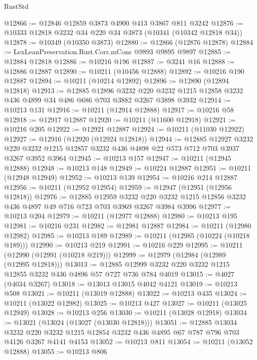 \begin{lexlean}{RustStd}
\begin{coremodule}
@12866 := @12846 @12859 @3873 @4900 @413 @3867 @811 @3242
@12876 := @10333 @12818 @3232 @34 @220 @34 @3873 (@10341 (@10342 @12818 @34))
@12878 := @10349 (@10350 @3873)
@12880 := @12866 (@12876 @12878)
@12884 := LexLeanPreservation.Rust.Corr.mCons @9893 @9895 @9897
@12885 := @12884 @12818
@12886 := @10216 @196
@12887 := @3241 @16
@12888 := @12886 @12887
@12890 := @10211 (@10456 @12888)
@12892 := @10216 @190 @12887
@12894 := @10211 (@10214 @12892)
@12896 := @12890 (@12894 @12818)
@12913 := @12885
    @12896
    @3232
    @220
    @3232
    @1215
    @12858
    @3232
    @436
    @4899
    @34
    @486
    @686
    @703
    @3882
    @3267
    @3898
    @3932
@12914 := @10213 @131
@12916 := @10211 (@12914 @12888)
@12917 := @10216 @58
@12918 := @12917 @12887
@12920 := @10211 (@11600 @12918)
@12921 := @10216 @205
@12922 := @12921 @12887
@12924 := @10211 (@11030 @12922)
@12927 := @12916 (@12920 (@12924 @12818))
@12944 := @12885
    @12927
    @3232
    @220
    @3232
    @1215
    @12857
    @3232
    @436
    @4898
    @22
    @573
    @712
    @703
    @3937
    @3267
    @3952
    @3964
@12945 := @10213 @157
@12947 := @10211 (@12945 @12888)
@12948 := @10213 @148
@12949 := @10224 @12887
@12951 := @10211 (@12948 @12949)
@12952 := @10213 @139
@12954 := @10216 @214 @12887
@12956 := @10211 (@12952 @12954)
@12959 := @12947 (@12951 (@12956 @12818))
@12976 := @12885
    @12959
    @3232
    @220
    @3232
    @1215
    @12856
    @3232
    @436
    @4897
    @49
    @716
    @723
    @703
    @3969
    @3267
    @3984
    @3996
@12977 := @10213 @204
@12979 := @10211 (@12977 @12888)
@12980 := @10213 @195
@12981 := @10216 @231
@12982 := @12981 @12887
@12984 := @10211 (@12980 @12982)
@12985 := @10213 @189
@12989 := @10211 (@12985 (@10224 (@10218 @189)))
@12990 := @10213 @219
@12991 := @10216 @229
@12995 := @10211 (@12990 (@12991 (@10218 @219)))
@12999 := @12979 (@12984 (@12989 (@12995 @12818)))
@13013 := @12885 @12999 @3232 @220 @3232 @1215 @12855 @3232 @436 @4896 @57 @727 @736 @784 @4019
@13015 := @4027 (@4034 @3267)
@13018 := @13013 @13015 @4042 @4121
@13019 := @10213 @508
@13021 := @10211 (@13019 @12888)
@13022 := @10213 @435
@13024 := @10211 (@13022 @12982)
@13025 := @10213 @427
@13027 := @10211 (@13025 @12949)
@13028 := @10213 @256
@13030 := @10211 (@13028 @12918)
@13034 := @13021 (@13024 (@13027 (@13030 @12818)))
@13051 := @12885
    @13034
    @3232
    @220
    @3232
    @1215
    @12854
    @3232
    @436
    @4895
    @67
    @787
    @796
    @703
    @4126
    @3267
    @4141
    @4153
@13052 := @10213 @811
@13054 := @10211 (@13052 @12888)
@13055 := @10213 @806

\end{coremodule}
\end{lexlean}
